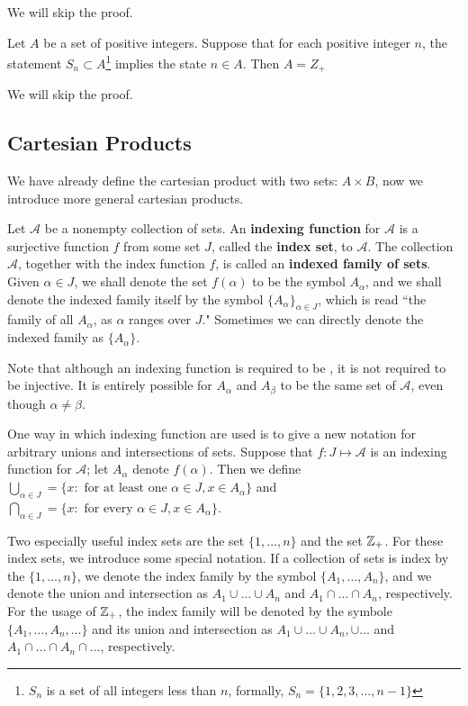 We will skip the proof.

\begin{theorem}
Let $A$ be a set of positive integers. Suppose that for each positive integer $n$, the statement $S_n \subset A$\footnote{$S_n$ is a set of all integers less than $n$, formally, $S_n = \{1, 2, 3, \dots, n -1\}$} implies the state $n \in A$. Then $A = Z_+$
\end{theorem}

We will skip the proof.

\subsection{Cartesian Products}

We have already define the cartesian product with two sets: $A \times B$, now we introduce more general cartesian products.

\begin{definition}
Let $\mathcal{A}$ be a nonempty collection of sets. An \textbf{indexing function} for $\mathcal{A}$ is a surjective function $f$ from some set $J$, called the \textbf{index set}, to $\mathcal{A}$. The collection $\mathcal{A}$, together with the index function $f$, is called an \textbf{indexed family of sets}. Given $\alpha \in J$, we shall denote the set $f(\alpha)$ to be the symbol $A_{\alpha}$, and we shall denote the indexed family itself by the symbol $\{A_\alpha\}_{\alpha \in J}$, which is read ``the family of all $A_{\alpha}$, as $\alpha$ ranges over $J$." Sometimes we can directly denote the indexed family as $\{A_{\alpha}\}$.
\end{definition}

Note that although an indexing function is required to be , it is not required to be injective. It is entirely possible for $A_{\alpha}$ and $A_{\beta}$ to be the same set of $\mathcal{A}$, even though $\alpha \neq \beta$.

One way in which indexing function are used is to give a new notation for arbitrary unions and intersections of sets. Suppose that $f: J \mapsto \mathcal{A}$ is an indexing function for $\mathcal{A}$; let $A_{\alpha}$ denote $f(\alpha)$. Then we define $\bigcup_{\alpha \in J} = \{x: \text{ for at least one } \alpha \in J, x \in A_{\alpha}\}$ and $\bigcap_{\alpha \in J} = \{x: \text{ for every } \alpha \in J, x \in A_{\alpha}\}$.

Two especially useful index sets are the set $\{1, \dots, n\}$ and the set $\mathbb{Z}_+$. For these index sets, we introduce some special notation. If a collection of sets is index by the $\{1, \dots, n\}$, we denote the index family by the symbol $\{A_1, \dots, A_n\}$, and we denote the union and intersection as $A_1 \cup \dots \cup A_n$ and $A_1 \cap \dots \cap A_n$, respectively. For the usage of $\mathbb{Z}_+$, the index family will be denoted by the symbole $\{A_1, \dots, A_n, \dots\}$ and its union and intersection as $A_1 \cup \dots \cup A_n, \cup \dots$ and $A_1 \cap \dots \cap A_n \cap \dots$, respectively.

